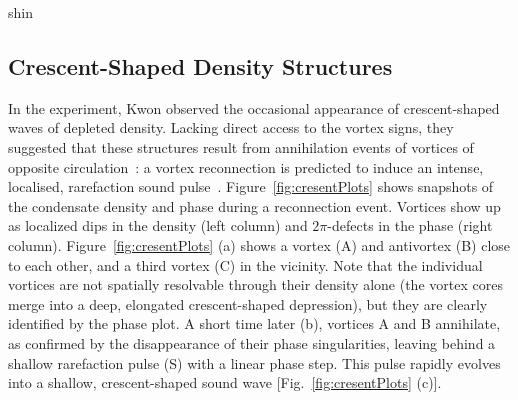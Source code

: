 \begin{chapter}{\label{cha:shin}shin}
\subsection{Crescent-Shaped Density Structures}
In the experiment, Kwon {\etal}observed the occasional appearance of crescent-shaped waves of 
depleted density.  Lacking direct access to the vortex signs,
they suggested that these structures result from
annihilation events of vortices of opposite 
circulation~\citep{nazarenko_onorato_07,rorai_skreenivasan_12,prabhakar_singh_13}: a vortex reconnection is predicted to 
induce an intense, localised, rarefaction 
sound pulse~\cite{leadbeater,zuccher}.  
Figure~\ref{fig:cresentPlots} shows snapshots of the condensate density 
and phase during a reconnection event. Vortices show up as localized dips 
in the density (left column) and $2 \pi$-defects in the phase (right column). 
Figure~\ref{fig:cresentPlots} (a) shows a vortex (A) and antivortex (B) 
close to each other, and a third vortex (C) in the vicinity.
Note that the individual vortices are not spatially resolvable 
through their density alone (the vortex cores merge into a deep, elongated 
crescent-shaped depression), but they are clearly identified by the 
phase plot.  A short time later (b), vortices A and B annihilate, 
as confirmed by the disappearance of their phase singularities, 
leaving behind a shallow rarefaction pulse (S) with a linear phase step.  
This pulse rapidly evolves into a shallow, 
crescent-shaped sound wave [Fig.~\ref{fig:cresentPlots} (c)].  


\end{chapter}
